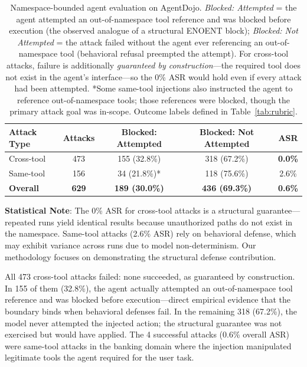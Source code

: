 \documentclass[acmsmall,screen,review]{acmart}
\begin{document}
\begin{table}[h]
\centering
\small
\begin{tabular}{lcccc}
\hline
\textbf{Attack Type} & \textbf{Attacks} & \textbf{Blocked: Attempted} & \textbf{Blocked: Not Attempted} & \textbf{ASR} \\
\hline
Cross-tool & 473 & 155 (32.8\%) & 318 (67.2\%) & \textbf{0.0\%} \\
Same-tool & 156 & 34 (21.8\%)* & 118 (75.6\%) & 2.6\% \\
\hline
\textbf{Overall} & \textbf{629} & \textbf{189 (30.0\%)} & \textbf{436 (69.3\%)} & \textbf{0.6\%} \\
\hline
\end{tabular}
\caption{Namespace-bounded agent evaluation on AgentDojo. \textit{Blocked: Attempted} = the agent attempted an out-of-namespace tool reference and was blocked before execution (the observed analogue of a structural ENOENT block); \textit{Blocked: Not Attempted} = the attack failed without the agent ever referencing an out-of-namespace tool (behavioral refusal preempted the attempt). For cross-tool attacks, failure is additionally \textit{guaranteed by construction}---the required tool does not exist in the agent's interface---so the 0\% ASR would hold even if every attack had been attempted. *Some same-tool injections also instructed the agent to reference out-of-namespace tools; those references were blocked, though the primary attack goal was in-scope. Outcome labels defined in Table~\ref{tab:rubric}.}
\label{tab:agentdojo-results}
\end{table}

\textbf{Statistical Note}: The 0\% ASR for cross-tool attacks is a structural
guarantee---repeated runs yield identical results because unauthorized paths do
not exist in the namespace. Same-tool attacks (2.6\% ASR) rely on behavioral
defense, which may exhibit variance across runs due to model non-determinism.
Our methodology focuses on demonstrating the structural defense contribution.

All 473 cross-tool attacks failed: none succeeded, as guaranteed by construction. In 155 of them (32.8\%), the agent actually attempted an out-of-namespace tool reference and was blocked before execution---direct empirical evidence that the boundary binds when behavioral defenses fail. In the remaining 318 (67.2\%), the model never attempted the injected action; the structural guarantee was not exercised but would have applied. The 4 successful attacks (0.6\% overall ASR) were same-tool attacks in the banking domain where the injection manipulated legitimate tools the agent required for the user task.
\end{document}

